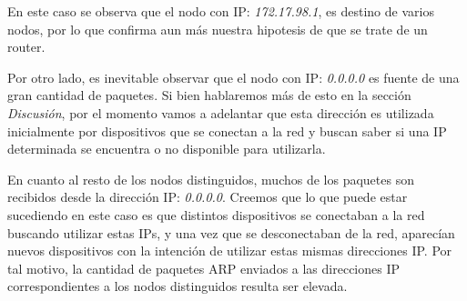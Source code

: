 En este caso se observa que el nodo con IP: \textit{172.17.98.1}, es destino de varios nodos, por lo que confirma aun más nuestra hipotesis de que se trate de un router.

Por otro lado, es inevitable observar que el nodo con IP: \textit{0.0.0.0} es fuente de una gran cantidad de paquetes. Si bien hablaremos más de esto en la sección \textit{Discusión}, por el momento vamos a adelantar que esta dirección es utilizada inicialmente por dispositivos que se conectan a la red y buscan saber si una IP determinada se encuentra o no disponible para utilizarla. 

En cuanto al resto de los nodos distinguidos, muchos de los paquetes son recibidos desde la dirección IP: \textit{0.0.0.0}. Creemos que lo que puede estar sucediendo en este caso es que distintos dispositivos se conectaban a la red buscando utilizar estas IPs, y una vez que se desconectaban de la red, aparecían nuevos dispositivos con la intención de utilizar estas mismas direcciones IP. Por tal motivo, la cantidad de paquetes ARP enviados a las direcciones IP correspondientes a los nodos distinguidos resulta ser elevada.
